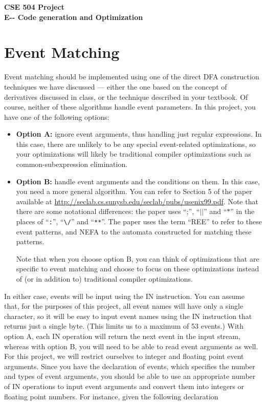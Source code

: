 \documentclass[10pt]{article}
\begin{document}
\newcommand{\LB}{$[$}
\newcommand{\RB}{$]\;$}
\newcommand{\LP}{$($}
\newcommand{\RP}{$)\;$}

\begin{center}
{\Large \bf CSE 504  Project}\\[0.1in]
{\large \bf E-{}- Code generation and Optimization}
\end{center}
\section{Event Matching}
%
Event matching should be implemented using one of the direct DFA construction
techniques we have discussed --- either the one based on the concept of
derivatives discussed in class, or the technique described in your textbook.
Of course, neither of these algorithms handle event parameters. In this
project, you have one of the following options:
\begin{itemize}
\item {\bf Option A:} ignore event arguments, thus handling just regular
  expressions. In this case, there are unlikely to be any special event-related
  optimizations, so your optimizations will likely be traditional
  compiler optimizations such as common-subexpression elimination.
%
\item {\bf Option B:} handle event arguments and the conditions on them.
  In this case, you need a more general algorithm. You can refer to
  Section 5 of the paper available at
  \url{http://seclab.cs.sunysb.edu/seclab/pubs/usenix99.pdf}. Note that
  there are some notational differences: the paper uses ``;'', ``$||$'' and
``$*$'' in the places of ``\verb+:+'', ``\verb+\/+'' and ``\verb+**+''.
The paper uses the term ``REE'' to refer to these event patterns,
and NEFA to the automata constructed for matching these patterns.

Note that when you choose option B, you can think of optimizations that
are specific to event matching and choose to focus on these optimizations
instead of (or in addition to) traditional compiler optimizations.
%
\end{itemize}
%
In either case, events will be input using the IN instruction. You can assume
that, for the purposes of this project, all event names will have only
a single character, so it will be easy to input event names using the
IN instruction that returns just a single byte. (This limits us to a
maximum of 53 events.) With option A, each IN operation will return the
next event in the input stream, whereas with option B, you will need to
be able to read event arguments as well. For this project, we will restrict
ourselves to integer and floating point event arguments. Since you have the
declaration of events, which specifies the number and types of event arguments,
you should be able to use an appropriate number of IN operations to input
event arguments and convert them into integers or floating point numbers.
For instance, given the following declaration
\end{document}
